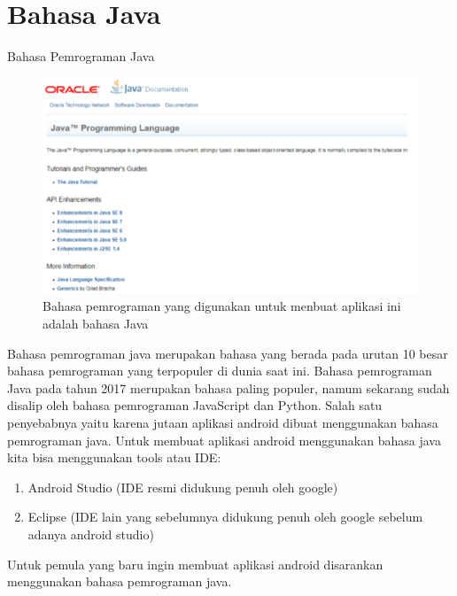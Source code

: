 \section{Bahasa Java}
\hfill \break
Bahasa Pemrograman Java
\begin{figure}[!htbp]
  \centering
  \includegraphics[width=.75\textwidth]{figures/java.png}
  \caption{Bahasa pemrograman yang digunakan untuk menbuat aplikasi ini adalah bahasa Java}\label{fig:error}
\end{figure}
\hfill \break
Bahasa pemrograman java merupakan bahasa yang berada pada urutan 10 besar bahasa pemrograman yang terpopuler di dunia saat ini. Bahasa pemrograman Java pada tahun 2017 merupakan bahasa paling populer, namum sekarang sudah disalip oleh bahasa pemrograman JavaScript dan Python.
\hfill \break
Salah satu penyebabnya yaitu karena jutaan aplikasi android dibuat menggunakan bahasa pemrograman java. Untuk membuat aplikasi android menggunakan bahasa java kita bisa menggunakan tools atau IDE:
\begin{enumerate}
\item Android Studio (IDE resmi didukung penuh oleh google)
\item Eclipse (IDE lain yang sebelumnya didukung penuh oleh google sebelum adanya android studio)
\end{enumerate}
\hfill \break
Untuk pemula yang baru ingin membuat aplikasi android disarankan menggunakan bahasa pemrograman java.
